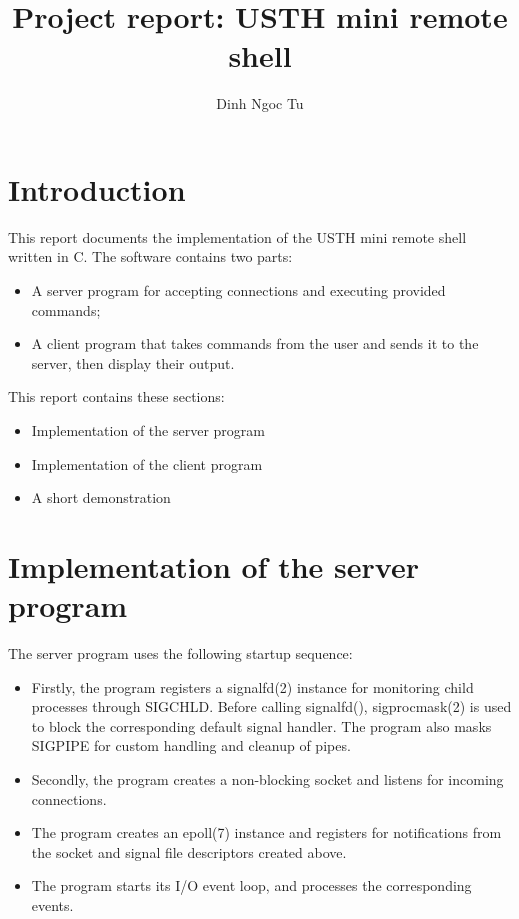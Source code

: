 \documentclass[12pt]{article}
\title{Project report: USTH mini remote shell}
\author[1]{Dinh Ngoc Tu}
\affil[1]{Master M1 ICT -- University of Science and Technology of Hanoi}
\begin{document}
\maketitle


\section{Introduction}

This report documents the implementation of the USTH mini remote shell written in C. The software contains two parts:

\begin{itemize}
\item A server program for accepting connections and executing provided commands;
\item A client program that takes commands from the user and sends it to the server, then display their output.
\end{itemize}

This report contains these sections:

\begin{itemize}
\item Implementation of the server program
\item Implementation of the client program
\item A short demonstration
\end{itemize}


\section{Implementation of the server program}

The server program uses the following startup sequence:

\begin{itemize}
\item Firstly, the program registers a signalfd(2) instance for monitoring child processes through SIGCHLD. Before calling signalfd(), sigprocmask(2) is used to block the corresponding default signal handler. The program also masks SIGPIPE for custom handling and cleanup of pipes.
\item Secondly, the program creates a non-blocking socket and listens for incoming connections.
\item The program creates an epoll(7) instance and registers for notifications from the socket and signal file descriptors created above.
\item The program starts its I/O event loop, and processes the corresponding events.
\end{itemize}
\end{document}
